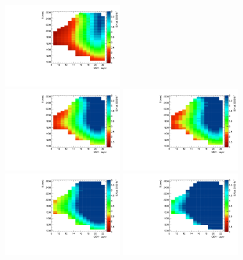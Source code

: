 \begin{figure}
  \centering
  \includegraphics[width=0.45\textwidth]{figures/hgcal/plot_zr/mold_mip_25_pdeC_34.9_40_sipmA_2.0_rad_4_sipmN_52_sipmAC_default_tileAC_default_S_N.pdf}\\
  \includegraphics[width=0.45\textwidth]{figures/hgcal/plot_zr/mold_mip_25_pdeC_34.9_40_sipmA_4.0_rad_4_sipmN_52_sipmAC_default_tileAC_default_S_N.pdf}
  \includegraphics[width=0.45\textwidth]{figures/hgcal/plot_zr/cast_mip_35_pdeC_34.9_40_sipmA_2.0_rad_4_sipmN_52_sipmAC_default_tileAC_default_S_N.pdf}\\
  \includegraphics[width=0.45\textwidth]{figures/hgcal/plot_zr/cast_mip_35_pdeC_34.9_40_sipmA_4.0_rad_4_sipmN_52_sipmAC_default_tileAC_default_S_N.pdf}
  \includegraphics[width=0.45\textwidth]{figures/hgcal/plot_zr/cast_mip_35_pdeC_34.9_40_sipmA_9.0_rad_4_sipmN_52_sipmAC_default_tileAC_default_S_N.pdf}

\end{figure}
